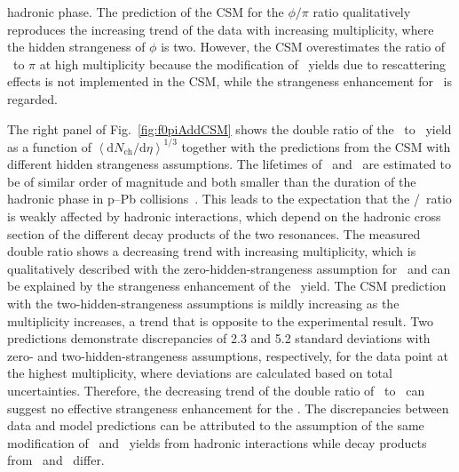 hadronic phase. The prediction of the CSM for the $\phi/\pi$ ratio qualitatively reproduces the increasing trend of the data with increasing multiplicity, where the hidden strangeness of $\phi$ is two. However, the CSM overestimates the ratio of \kstar~to $\pi$ at high multiplicity because the modification of \kstar~yields due to rescattering effects is not implemented in the CSM, while the strangeness enhancement for \kstar~is regarded.

The right panel of Fig.~\ref{fig:f0piAddCSM} shows the double ratio of the \fzero~to \kstar~yield as a function of $\left\langle \mathrm{d}N_{\mathrm{ch}}/\mathrm{d}\eta \right\rangle^{1/3}$ together with the predictions from the CSM with different hidden strangeness assumptions. The lifetimes of \fzero~and \kstar~are estimated to be of similar order of magnitude and both smaller than the duration of the hadronic phase in p--Pb collisions~\cite{ParticleDataGroup:2022pth}. This leads to the expectation that the \fzero/\kstar~ratio is weakly affected by hadronic interactions, which depend on the hadronic cross section of the different decay products of the two resonances. The measured double ratio shows a decreasing trend with increasing multiplicity, which is qualitatively described with the zero-hidden-strangeness assumption for \fzero~and can be explained by the strangeness enhancement of the \kstar~yield. The CSM prediction with the two-hidden-strangeness assumptions is mildly increasing as the multiplicity increases, a trend that is opposite to the experimental result. Two predictions demonstrate discrepancies of 2.3 and 5.2 standard deviations with zero- and two-hidden-strangeness assumptions, respectively, for the data point at the highest multiplicity, where deviations are calculated based on total uncertainties. Therefore, the decreasing trend of the double ratio of \fzero~to \kstar~can suggest no effective strangeness enhancement for the \fzero. The discrepancies between data and model predictions can be attributed to the assumption of the same modification of \fzero~and \kstar~yields from hadronic interactions while decay products from \fzero~and \kstar~differ.

